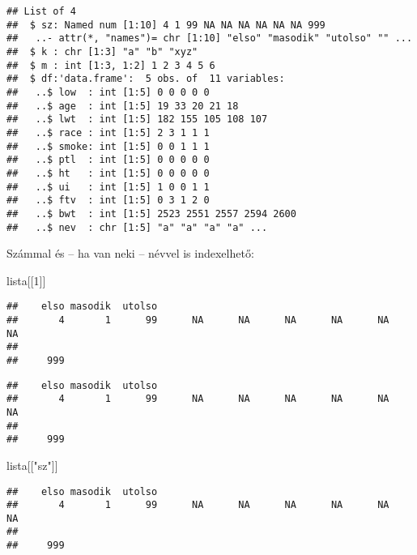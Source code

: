 \documentclass[]{book}
\newenvironment{Shaded}{\begin{snugshade}}{\end{snugshade}}
\newcommand{\DecValTok}[1]{\textcolor[rgb]{0.00,0.00,0.81}{#1}}
\newcommand{\NormalTok}[1]{#1}
\newcommand{\OperatorTok}[1]{\textcolor[rgb]{0.81,0.36,0.00}{\textbf{#1}}}
\newcommand{\StringTok}[1]{\textcolor[rgb]{0.31,0.60,0.02}{#1}}
\begin{document}
\begin{verbatim}
## List of 4
##  $ sz: Named num [1:10] 4 1 99 NA NA NA NA NA NA 999
##   ..- attr(*, "names")= chr [1:10] "elso" "masodik" "utolso" "" ...
##  $ k : chr [1:3] "a" "b" "xyz"
##  $ m : int [1:3, 1:2] 1 2 3 4 5 6
##  $ df:'data.frame':  5 obs. of  11 variables:
##   ..$ low  : int [1:5] 0 0 0 0 0
##   ..$ age  : int [1:5] 19 33 20 21 18
##   ..$ lwt  : int [1:5] 182 155 105 108 107
##   ..$ race : int [1:5] 2 3 1 1 1
##   ..$ smoke: int [1:5] 0 0 1 1 1
##   ..$ ptl  : int [1:5] 0 0 0 0 0
##   ..$ ht   : int [1:5] 0 0 0 0 0
##   ..$ ui   : int [1:5] 1 0 0 1 1
##   ..$ ftv  : int [1:5] 0 3 1 2 0
##   ..$ bwt  : int [1:5] 2523 2551 2557 2594 2600
##   ..$ nev  : chr [1:5] "a" "a" "a" "a" ...
\end{verbatim}

Számmal és -- ha van neki -- névvel is indexelhető:

\begin{Shaded}
\begin{Highlighting}[]
\NormalTok{lista[[}\DecValTok{1}\NormalTok{]]}
\end{Highlighting}
\end{Shaded}

\begin{verbatim}
##    elso masodik  utolso                                                 
##       4       1      99      NA      NA      NA      NA      NA      NA 
##         
##     999
\end{verbatim}

\begin{Shaded}
\end{Shaded}

\begin{verbatim}
##    elso masodik  utolso                                                 
##       4       1      99      NA      NA      NA      NA      NA      NA 
##         
##     999
\end{verbatim}

\begin{Shaded}
\begin{Highlighting}[]
\NormalTok{lista[[}\StringTok{"sz"}\NormalTok{]]}
\end{Highlighting}
\end{Shaded}

\begin{verbatim}
##    elso masodik  utolso                                                 
##       4       1      99      NA      NA      NA      NA      NA      NA 
##         
##     999
\end{verbatim}
\end{document}

